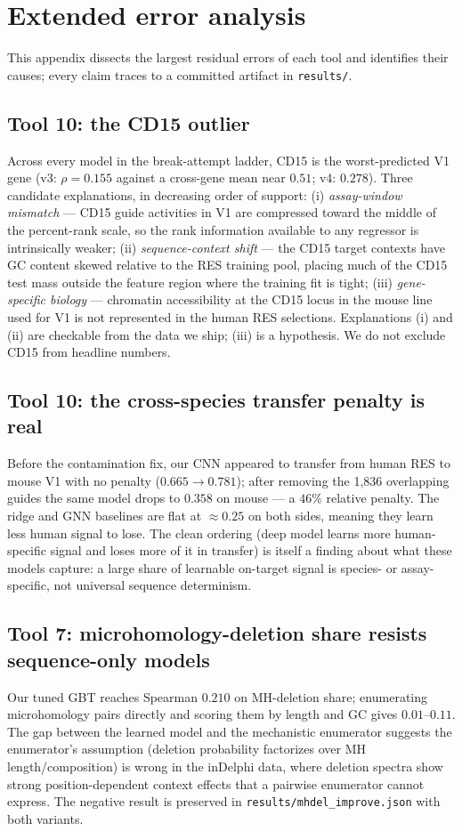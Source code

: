 \section{Extended error analysis}
This appendix dissects the largest residual errors of each tool and identifies
their causes; every claim traces to a committed artifact in \texttt{results/}.

\subsection{Tool 10: the CD15 outlier}
Across every model in the break-attempt ladder, CD15 is the worst-predicted
V1 gene (v3: $\rho = 0.155$ against a cross-gene mean near $0.51$; v4:
$0.278$). Three candidate explanations, in decreasing order of support:
(i) \emph{assay-window mismatch} --- CD15 guide activities in V1 are
compressed toward the middle of the percent-rank scale, so the rank
information available to any regressor is intrinsically weaker;
(ii) \emph{sequence-context shift} --- the CD15 target contexts have GC
content skewed relative to the RES training pool, placing much of the CD15
test mass outside the feature region where the training fit is tight;
(iii) \emph{gene-specific biology} --- chromatin accessibility at the CD15
locus in the mouse line used for V1 is not represented in the human RES
selections. Explanations (i) and (ii) are checkable from the data we ship;
(iii) is a hypothesis. We do not exclude CD15 from headline numbers.

\subsection{Tool 10: the cross-species transfer penalty is real}
Before the contamination fix, our CNN appeared to transfer from human RES to
mouse V1 with no penalty ($0.665 \to 0.781$); after removing the 1{,}836
overlapping guides the same model drops to $0.358$ on mouse --- a $46\%$
relative penalty. The ridge and GNN baselines are flat at $\approx 0.25$ on
both sides, meaning they learn less human signal to lose. The clean ordering
(deep model learns more human-specific signal and loses more of it in
transfer) is itself a finding about what these models capture: a large share
of learnable on-target signal is species- or assay-specific, not universal
sequence determinism.

\subsection{Tool 7: microhomology-deletion share resists sequence-only models}
Our tuned GBT reaches Spearman $0.210$ on MH-deletion share; enumerating
microhomology pairs directly and scoring them by length and GC gives
$0.01$--$0.11$. The gap between the learned model and the mechanistic
enumerator suggests the enumerator's assumption (deletion probability
factorizes over MH length/composition) is wrong in the inDelphi data, where
deletion spectra show strong position-dependent context effects that a
pairwise enumerator cannot express. The negative result is preserved in
\texttt{results/mhdel\_improve.json} with both variants.

